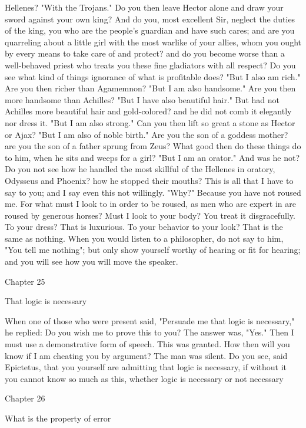\documentclass[a4paper]{article}
\begin{document}
Hellenes? "With the Trojans." Do you then leave Hector alone and draw your
sword against your own king? And do you, most excellent Sir, neglect the duties
of the king, you who are the people's guardian and have such cares; and are you
quarreling about a little girl with the most warlike of your allies, whom you
ought by every means to take care of and protect? and do you become worse than
a well-behaved priest who treats you these fine gladiators with all respect? Do
you see what kind of things ignorance of what is profitable does?
    "But I also am rich." Are you then richer than Agamemnon? "But I am also
handsome." Are you then more handsome than Achilles? "But I have also beautiful
hair." But had not Achilles more beautiful hair and gold-colored? and he did
not comb it elegantly nor dress it. "But I am also strong." Can you then lift
so great a stone as Hector or Ajax? "But I am also of noble birth." Are you the
son of a goddess mother? are you the son of a father sprung from Zeus? What
good then do these things do to him, when he sits and weeps for a girl? "But I
am an orator." And was he not? Do you not see how he handled the most skillful
of the Hellenes in oratory, Odysseus and Phoenix? how he stopped their mouths?
    This is all that I have to say to you; and I say even this not willingly.
"Why?" Because you have not roused me. For what must I look to in order to be
roused, as men who are expert in are roused by generous horses? Must I look to
your body? You treat it disgracefully. To your dress? That is luxurious. To
your behavior to your look? That is the same as nothing. When you would listen
to a philosopher, do not say to him, "You tell me nothing"; but only show
yourself worthy of hearing or fit for hearing; and you will see how you will
move the speaker.

Chapter 25

That logic is necessary

    When one of those who were present said, "Persuade me that logic is
necessary," he replied: Do you wish me to prove this to you? The answer was,
"Yes." Then I must use a demonstrative form of speech. This was granted. How
then will you know if I am cheating you by argument? The man was silent. Do you
see, said Epictetus, that you yourself are admitting that logic is necessary,
if without it you cannot know so much as this, whether logic is necessary or
not necessary

Chapter 26

What is the property of error
\end{document}
